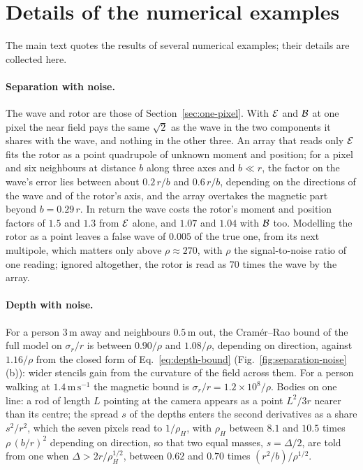 \section{Details of the numerical examples}\label{app:benchmarks}

The main text quotes the results of several numerical examples; their details
are collected here.

\paragraph{Separation with noise.} The wave and rotor are those of
Section~\ref{sec:one-pixel}. With $\mathcal{E}$ and $\mathcal{B}$ at one pixel the near field
pays the same $\sqrt2$ as the wave in the two components it shares with the
wave, and nothing in the other three. An array that reads only $\mathcal{E}$ fits the
rotor as a point quadrupole of unknown moment and position; for a pixel and six
neighbours at distance $b$ along three axes and $b \ll r$, the factor on the
wave's error lies between about $0.2\,r/b$ and $0.6\,r/b$, depending on the
directions of the wave and of the rotor's axis, and the array overtakes the magnetic part beyond $b = 0.29\,r$.
In return the wave costs the rotor's moment and position factors of $1.5$ and
$1.3$ from $\mathcal{E}$ alone, and $1.07$ and $1.04$ with $\mathcal{B}$ too. Modelling the
rotor as a point leaves a false wave of $0.005$ of the true one, from its next
multipole, which matters only above $\rho \approx 270$, with $\rho$ the
signal-to-noise ratio of one reading; ignored altogether, the
rotor is read as $70$ times the wave by the array.

\paragraph{Depth with noise.} For a person $3\,\mathrm{m}$ away and neighbours
$0.5\,\mathrm{m}$ out, the Cram\'er--Rao bound of the full model on
$\sigma_r/r$ is between $0.90/\rho$ and $1.08/\rho$, depending on direction,
against $1.16/\rho$ from the closed form of Eq.~\eqref{eq:depth-bound}
(Fig.~\ref{fig:separation-noise}(b)): wider
stencils gain from the curvature of the field across them. For a person walking
at $1.4\,\mathrm{m\,s^{-1}}$ the magnetic bound is $\sigma_r/r =
1.2\times10^{8}/\rho$. Bodies on one line: a rod of length $L$ pointing at the
camera appears as a point $L^2/3r$ nearer than its centre; the spread $s$ of the
depths enters the second derivatives as a share $s^2/r^2$, which the seven
pixels read to $1/\rho_H$, with $\rho_H$ between $8.1$ and $10.5$ times
$\rho\,(b/r)^2$ depending on direction, so that two equal masses, $s =
\Delta/2$, are told from one when $\Delta > 2r/\rho_H^{1/2}$, between $0.62$
and $0.70$ times $(r^2/b)/\rho^{1/2}$.

